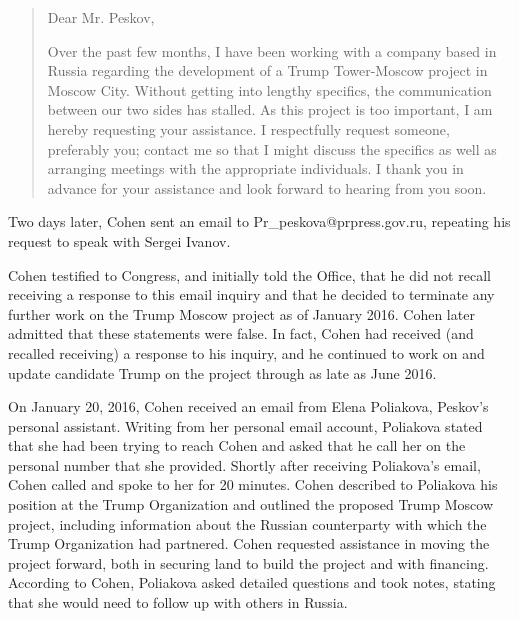 \begin{quote}
Dear Mr. Peskov,

Over the past few months, I have been working with a company based in Russia regarding the development of a Trump Tower-Moscow project in Moscow City.
Without getting into lengthy specifics, the communication between our two sides has stalled.
As this project is too important, I am hereby requesting your assistance.
I respectfully request someone, preferably you; contact me so that I might discuss the specifics as well as arranging meetings with the appropriate individuals.
I thank you in advance for your assistance and look forward to hearing from you soon.%
\end{quote}

Two days later, Cohen sent an email to Pr_peskova@prpress.gov.ru, repeating his request to speak with Sergei Ivanov.%

Cohen testified to Congress, and initially told the Office, that he did not recall receiving a response to this email inquiry and that he decided to terminate any further work on the Trump Moscow project as of January 2016.
Cohen later admitted that these statements were false.
In fact, Cohen had received (and recalled receiving) a response to his inquiry, and he continued to work on and update candidate Trump on the project through as late as June 2016.%

On January 20, 2016, Cohen received an email from Elena Poliakova, Peskov's personal assistant.
Writing from her personal email account, Poliakova stated that she had been trying to reach Cohen and asked that he call her on the personal number that she provided.%
Shortly after receiving Poliakova's email, Cohen called and spoke to her for 20 minutes.%
Cohen described to Poliakova his position at the Trump Organization and outlined the proposed Trump Moscow project, including information about the Russian counterparty with which the Trump Organization had partnered.
Cohen requested assistance in moving the project forward, both in securing land to build the project and with financing.
According to Cohen, Poliakova asked detailed questions and took notes, stating that she would need to follow up with others in Russia.%

